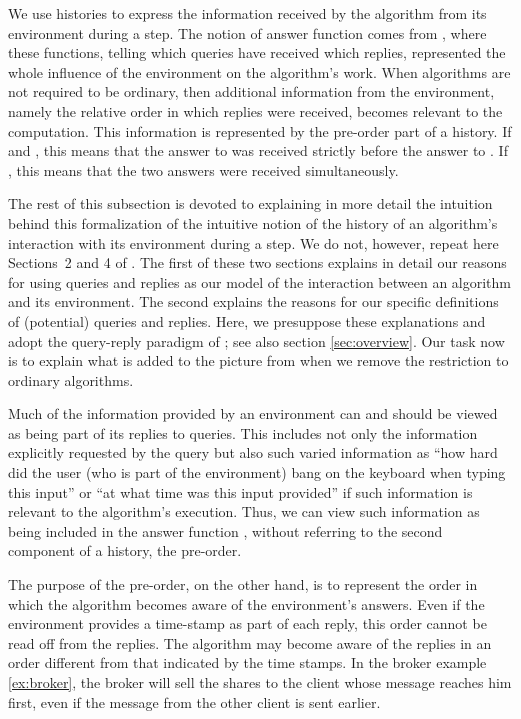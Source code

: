 \documentclass{LMCS}
\theoremstyle{definition}
\begin{document}
We use histories to express the information received by the algorithm
from its environment during a step.  The notion of answer function
comes from \cite{oa1}, where these functions, telling which queries
have received which replies, represented the whole influence of the
environment on the algorithm's work.  When algorithms are not required
to be ordinary, then additional information from the environment,
namely the relative order in which replies were received, becomes
relevant to the computation.  This information is represented by the
pre-order part of a history.  If  and , this
means that the answer  to  was received strictly
before the answer  to .  If , this
means that the two answers were received simultaneously.

The rest of this subsection is devoted to explaining in more detail
the intuition behind this formalization of the intuitive notion of
the history of an algorithm's interaction with its environment
during a step.  We do not, however, repeat here Sections~2 and 4 of
\cite{oa1}. The first of these two sections explains in detail our
reasons for using queries and replies as our model of the
interaction between an algorithm and its environment.  The second
explains the reasons for our specific definitions of (potential)
queries and replies.  Here, we presuppose these explanations and
adopt the query-reply paradigm of \cite{oa1}; see also section
\ref{sec:overview}. Our task now is to explain what is added to the
picture from \cite{oa1} when we remove the restriction to ordinary
algorithms.

Much of the information provided by an environment can and should be
viewed as being part of its replies to queries.  This includes not
only the information explicitly requested by the query but also such
varied information as ``how hard did the user (who is part of the
environment) bang on the keyboard when typing this input'' or ``at
what time was this input provided'' if such information is relevant to
the algorithm's execution.  Thus, we can view such information as being
included in the answer function , without referring to the second
component of a history, the pre-order.

The purpose of the pre-order, on the other hand, is to represent the
order in which the algorithm becomes aware of the environment's
answers.  Even if the environment provides a time-stamp as part of
each reply, this order cannot be read off from the replies.  The
algorithm may become aware of the replies in an order different from
that indicated by the time stamps. In the
broker example \ref{ex:broker}, the broker will sell the shares to the
client whose message reaches him first, even if the message from the
other client is sent earlier.
\end{document}
